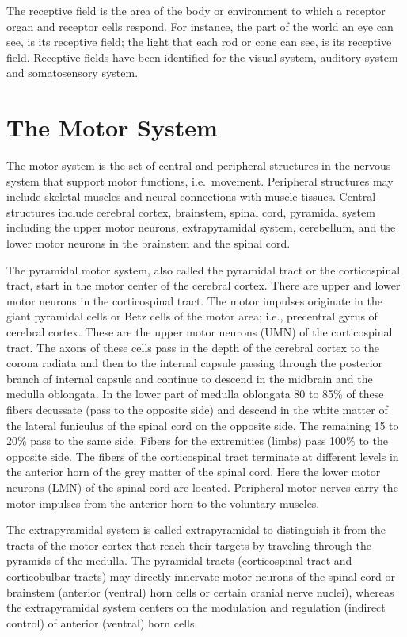 \documentclass[]{book}
\begin{document}
The receptive field is the area of the body or environment to which a receptor organ and receptor cells respond. For instance, the part of the world an eye can see, is its receptive field; the light that each rod or cone can see, is its receptive field. Receptive fields have been identified for the visual system, auditory system and somatosensory system.

\hypertarget{the-motor-system}{%
\section{The Motor System}\label{the-motor-system}}

The motor system is the set of central and peripheral structures in the nervous system that support motor functions, i.e.~movement. Peripheral structures may include skeletal muscles and neural connections with muscle tissues. Central structures include cerebral cortex, brainstem, spinal cord, pyramidal system including the upper motor neurons, extrapyramidal system, cerebellum, and the lower motor neurons in the brainstem and the spinal cord.

The pyramidal motor system, also called the pyramidal tract or the corticospinal tract, start in the motor center of the cerebral cortex. There are upper and lower motor neurons in the corticospinal tract. The motor impulses originate in the giant pyramidal cells or Betz cells of the motor area; i.e., precentral gyrus of cerebral cortex. These are the upper motor neurons (UMN) of the corticospinal tract. The axons of these cells pass in the depth of the cerebral cortex to the corona radiata and then to the internal capsule passing through the posterior branch of internal capsule and continue to descend in the midbrain and the medulla oblongata. In the lower part of medulla oblongata 80 to 85\% of these fibers decussate (pass to the opposite side) and descend in the white matter of the lateral funiculus of the spinal cord on the opposite side. The remaining 15 to 20\% pass to the same side. Fibers for the extremities (limbs) pass 100\% to the opposite side. The fibers of the corticospinal tract terminate at different levels in the anterior horn of the grey matter of the spinal cord. Here the lower motor neurons (LMN) of the spinal cord are located. Peripheral motor nerves carry the motor impulses from the anterior horn to the voluntary muscles.

The extrapyramidal system is called extrapyramidal to distinguish it from the tracts of the motor cortex that reach their targets by traveling through the pyramids of the medulla. The pyramidal tracts (corticospinal tract and corticobulbar tracts) may directly innervate motor neurons of the spinal cord or brainstem (anterior (ventral) horn cells or certain cranial nerve nuclei), whereas the extrapyramidal system centers on the modulation and regulation (indirect control) of anterior (ventral) horn cells.
\end{document}
